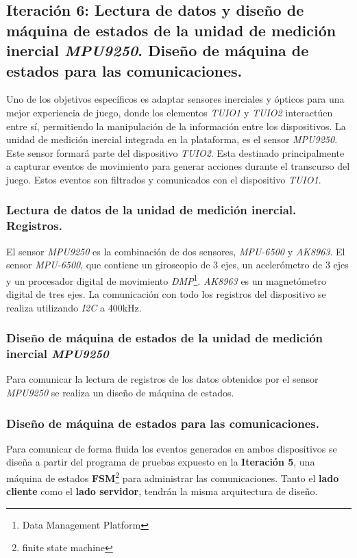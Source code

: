 \subsection{Iteración 6: Lectura de datos y diseño de máquina de estados de la unidad de medición inercial \emph{MPU9250}. Diseño de máquina de estados para las comunicaciones.}
Uno de los objetivos específicos es adaptar sensores inerciales y ópticos para una mejor experiencia de juego, donde los elementos \emph{TUIO1} y \emph{TUIO2} interactúen entre sí, permitiendo la manipulación de la información entre los dispositivos.
La unidad de medición inercial integrada en la plataforma, es el sensor \emph{MPU9250}. Este sensor formará parte del dispositivo \emph{TUIO2}. Esta destinado principalmente a capturar eventos de movimiento para generar acciones durante el transcurso del juego. Estos eventos son filtrados y comunicados con el dispositivo \emph{TUIO1}.

\subsubsection{Lectura de datos de la unidad de medición inercial. Registros.}
El sensor \emph{MPU9250} es la combinación de dos sensores, \emph{MPU-6500} y \emph{AK8963}. El sensor \emph{MPU-6500}, que contiene un giroscopio de 3 ejes, un acelerómetro de 3 ejes y un procesador digital de movimiento \emph{DMP}\footnote{Data Management Platform}. \emph{AK8963} es un magnetómetro digital de tres ejes.
La comunicación con todo los registros del dispositivo se realiza utilizando \emph{I2C} a 400kHz.

\subsubsection{Diseño de máquina de estados de la unidad de medición inercial \emph{MPU9250}}
Para comunicar la lectura de registros de los datos obtenidos por el sensor \emph{MPU9250} se realiza un diseño de máquina de estados.

\subsubsection{Diseño de máquina de estados para las comunicaciones.}
Para comunicar de forma fluida los eventos generados en ambos dispositivos se diseña a partir del programa de pruebas expuesto en la \textbf{Iteración 5}, una máquina de estados \textbf{FSM}\footnote{finite state machine} para administrar las comunicaciones. Tanto el \textbf{lado cliente} como el \textbf{lado servidor}, tendrán la misma arquitectura de diseño. 

